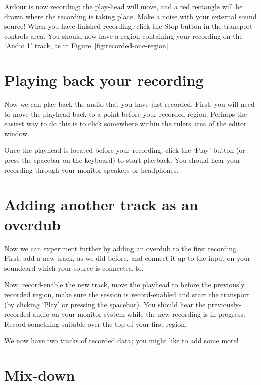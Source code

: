 \documentclass[10pt,a4paper]{book}
\newcommand{\screenshot}[3]{%
\begin{figure}[ht]%
\begin{center}
\texttt{[image: screenshots/\#1]}
\end{center}
\caption{#2}
\label{#3}
\end{figure}}
\begin{document}
{Ardour is now recording; the play-head will move, and a red rectangle
will be drawn where the recording is taking place.  Make a noise with
your external sound source!  When you have finished recording, click
the Stop button in the transport controls area.  You should now have a
region containing your recording on the `Audio 1' track, as in
Figure~\ref{fig:recorded-one-region}.


\section{Playing back your recording}

Now we can play back the audio that you have just recorded.  First,
you will need to move the playhead back to a point before your
recorded region.  Perhaps the easiest way to do this is to click
somewhere within the rulers area of the editor window.


Once the playhead is located before your recording, click the `Play'
button (or press the spacebar on the keyboard) to start playback.  You
should hear your recording through your monitor speakers or
headphones.

\section{Adding another track as an overdub}

Now we can experiment further by adding an overdub to the first
recording.  First, add a new track, as we did before, and connect it
up to the input on your soundcard which your source is connected to.

Now, record-enable the new track, move the playhead to before the
previously recorded region, make sure the session is record-enabled
and start the transport (by clicking `Play' or pressing the spacebar).
You should hear the previously-recorded audio on your monitor system
while the new recording is in progress.  Record something suitable
over the top of your first region.

We now have two tracks of recorded data; you might like to add some
more!

\section{Mix-down}

}
\end{document}
